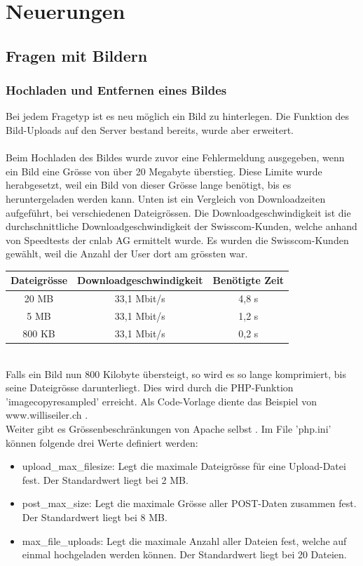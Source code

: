 \section{Neuerungen}

\subsection{Fragen mit Bildern}

\subsubsection{Hochladen und Entfernen eines Bildes}
Bei jedem Fragetyp ist es neu möglich ein Bild zu hinterlegen. Die Funktion des Bild-Uploads auf den Server bestand bereits, wurde aber erweitert.
\\
\\
Beim Hochladen des Bildes wurde zuvor eine Fehlermeldung ausgegeben, wenn ein Bild eine Grösse von über 20 Megabyte überstieg. Diese Limite wurde herabgesetzt, weil ein Bild von dieser Grösse lange benötigt, bis es heruntergeladen werden kann. Unten ist ein Vergleich von Downloadzeiten aufgeführt, bei verschiedenen Dateigrössen. Die Downloadgeschwindigkeit ist die durchschnittliche Downloadgeschwindigkeit der Swisscom-Kunden, welche anhand von Speedtests der cnlab AG \cite{cnlab_speedtest} ermittelt wurde. Es wurden die Swisscom-Kunden gewählt, weil die Anzahl der User dort am grössten war. \\

\begin{tabular}{|c|c|c|}
	\hline 
	Dateigrösse & Downloadgeschwindigkeit & Benötigte Zeit \\ 
	\hline 
	20 MB & 33,1 Mbit/s & 4,8 s \\ 
	\hline 
	5 MB & 33,1 Mbit/s & 1,2 s \\ 
	\hline 
	800 KB & 33,1 Mbit/s & 0,2 s \\ 
	\hline 
\end{tabular}\\

Falls ein Bild nun 800 Kilobyte übersteigt, so wird es so lange komprimiert, bis seine Dateigrösse darunterliegt. Dies wird durch die PHP-Funktion 'imagecopyresampled' erreicht. Als Code-Vorlage diente das Beispiel von www.williseiler.ch \cite{willis_php}. \\

Weiter gibt es Grössenbeschränkungen von Apache selbst \cite{stackoverflow_largeFilePHP}. Im File 'php.ini' können folgende drei Werte definiert werden:
\begin{itemize}
	\item upload\_max\_filesize: Legt die maximale Dateigrösse für eine Upload-Datei fest. Der Standardwert liegt bei 2 MB.
	\item post\_max\_size: Legt die maximale Grösse aller POST-Daten zusammen fest. Der Standardwert liegt bei 8 MB.
	\item max\_file\_uploads: Legt die maximale Anzahl aller Dateien fest, welche auf einmal hochgeladen werden können. Der Standardwert liegt bei 20 Dateien.
\end{itemize}

